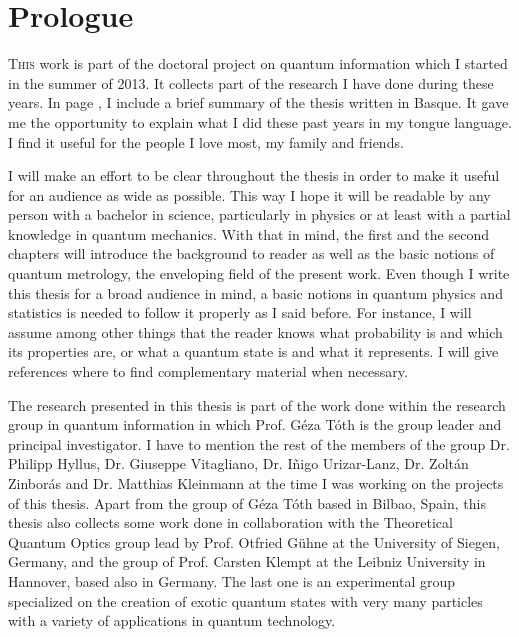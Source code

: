 \section*{Prologue}
\setcounter{page}{1}
\fancyfoot[LE,RO]{\thepage}
\label{sec:pr}

\lettrine[lines=2, findent=3pt,nindent=0pt]{T}{his} work is part of the doctoral project on quantum information which I started in the summer of 2013.
It collects part of the research I have done during these years.
In page \pageref{sec:la}, I include a brief summary of the thesis written in Basque.
It gave me the opportunity to explain what I did these past years in my tongue language.
I find it useful for the people I love most, my family and friends.

I will make an effort to be clear throughout the thesis in order to make it useful for an audience as wide as possible.
This way I hope it will be readable by any person with a bachelor in science, particularly in physics or at least with a partial knowledge in quantum mechanics.
With that in mind, the first and the second chapters will introduce the background to reader as well as the basic notions of quantum metrology, the enveloping field of the present work.
Even though I write this thesis for a broad audience in mind, a basic notions in quantum physics and statistics is needed to follow it properly as I said before.
For instance, I will assume among other things that the reader knows what probability is and which its properties are, or what a quantum state is and what it represents.
I will give references where to find complementary material when necessary.

The research presented in this thesis is part of the work done within the research group in quantum information in which Prof.
G\'eza T\'oth is the group leader and principal investigator.
I have to mention the rest of the members of the group Dr. Philipp Hyllus, Dr. Giuseppe Vitagliano, Dr. I\~nigo Urizar-Lanz, Dr. Zolt\'an Zinbor\'as and Dr. Matthias Kleinmann at the time I was working on the projects of this thesis.
Apart from the group of G\'eza T\'oth based in Bilbao, Spain, this thesis also collects some work done in collaboration with the Theoretical Quantum Optics group lead by Prof. Otfried G\"uhne at the University of Siegen, Germany, and the group of Prof. Carsten Klempt at the Leibniz University in Hannover, based also in Germany.
The last one is an experimental group specialized on the creation of exotic quantum states with very many particles with a variety of applications in quantum technology.

